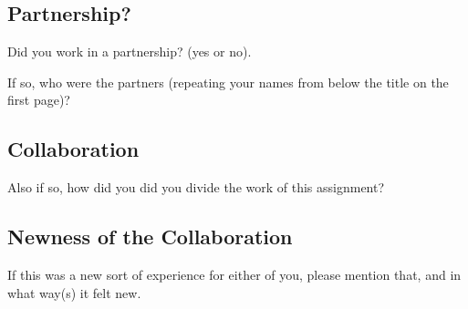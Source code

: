 \documentclass{article}
\begin{document}
\subsection{Partnership?}
Did you work in a partnership? (yes or no).

If so, who were the partners (repeating your names from below the title on the first page)?

\subsection{Collaboration}
Also if so, how did you did you divide the work of this assignment?

\subsection{Newness of the Collaboration}
If this was a new sort of experience for either of you, please mention that,
and in what way(s) it felt new.
\end{document}
